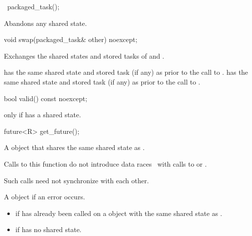 %
\begin{itemdecl}
~packaged_task();
\end{itemdecl}

\begin{itemdescr}
\pnum
\effects
Abandons any shared state.
\end{itemdescr}

%
\begin{itemdecl}
void swap(packaged_task& other) noexcept;
\end{itemdecl}

\begin{itemdescr}
\pnum
\effects
Exchanges the shared states and stored tasks of  and .

\pnum
\ensures
{} has the same shared state
and stored task (if any) as 
prior to the call to .  has the same shared state
and stored task (if any)
as  prior to the call to .
\end{itemdescr}

%
\begin{itemdecl}
bool valid() const noexcept;
\end{itemdecl}

\begin{itemdescr}
\pnum
\returns
{} only if  has a shared state.
\end{itemdescr}

%
\begin{itemdecl}
future<R> get_future();
\end{itemdecl}

\begin{itemdescr}
\pnum
\returns
A  object that shares the same shared state as .

\pnum
\sync
Calls to this function do not introduce
data races~ with calls to
 or
.
\begin{note}
Such calls need not synchronize with each other.
\end{note}

\pnum
\throws
A  object if an error occurs.

\pnum
\errors
\begin{itemize}
\item {} if  has already been called on
a  object with the same shared state as .
\item {} if  has no shared state.
\end{itemize}
\end{itemdescr}

